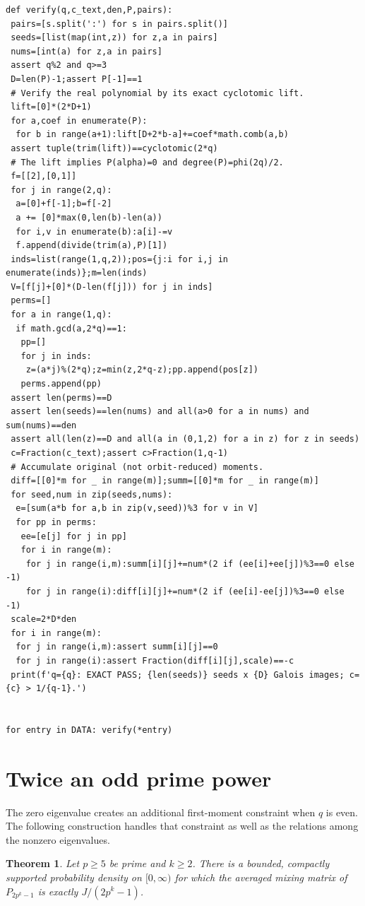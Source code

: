 \documentclass[11pt,a4paper]{article}
\newtheorem{theorem}{Theorem}[section]
\theoremstyle{definition}\newtheorem{definition}[theorem]{Definition}
\theoremstyle{remark}\newtheorem{remark}[theorem]{Remark}
\begin{document}
{\begin{verbatim}
def verify(q,c_text,den,P,pairs):
 pairs=[s.split(':') for s in pairs.split()]
 seeds=[list(map(int,z)) for z,a in pairs]
 nums=[int(a) for z,a in pairs]
 assert q%2 and q>=3
 D=len(P)-1;assert P[-1]==1
 # Verify the real polynomial by its exact cyclotomic lift.
 lift=[0]*(2*D+1)
 for a,coef in enumerate(P):
  for b in range(a+1):lift[D+2*b-a]+=coef*math.comb(a,b)
 assert tuple(trim(lift))==cyclotomic(2*q)
 # The lift implies P(alpha)=0 and degree(P)=phi(2q)/2.
 f=[[2],[0,1]]
 for j in range(2,q):
  a=[0]+f[-1];b=f[-2]
  a += [0]*max(0,len(b)-len(a))
  for i,v in enumerate(b):a[i]-=v
  f.append(divide(trim(a),P)[1])
 inds=list(range(1,q,2));pos={j:i for i,j in enumerate(inds)};m=len(inds)
 V=[f[j]+[0]*(D-len(f[j])) for j in inds]
 perms=[]
 for a in range(1,q):
  if math.gcd(a,2*q)==1:
   pp=[]
   for j in inds:
    z=(a*j)%(2*q);z=min(z,2*q-z);pp.append(pos[z])
   perms.append(pp)
 assert len(perms)==D
 assert len(seeds)==len(nums) and all(a>0 for a in nums) and sum(nums)==den
 assert all(len(z)==D and all(a in (0,1,2) for a in z) for z in seeds)
 c=Fraction(c_text);assert c>Fraction(1,q-1)
 # Accumulate original (not orbit-reduced) moments.
 diff=[[0]*m for _ in range(m)];summ=[[0]*m for _ in range(m)]
 for seed,num in zip(seeds,nums):
  e=[sum(a*b for a,b in zip(v,seed))%3 for v in V]
  for pp in perms:
   ee=[e[j] for j in pp]
   for i in range(m):
    for j in range(i,m):summ[i][j]+=num*(2 if (ee[i]+ee[j])%3==0 else -1)
    for j in range(i):diff[i][j]+=num*(2 if (ee[i]-ee[j])%3==0 else -1)
 scale=2*D*den
 for i in range(m):
  for j in range(i,m):assert summ[i][j]==0
  for j in range(i):assert Fraction(diff[i][j],scale)==-c
 print(f'q={q}: EXACT PASS; {len(seeds)} seeds x {D} Galois images; c={c} > 1/{q-1}.')


for entry in DATA: verify(*entry)
\end{verbatim}
}


\section{Twice an odd prime power}
\label{sec:twice-prime-powers}

The zero eigenvalue creates an additional first-moment constraint when
$q$ is even. The following construction handles that constraint as well
as the relations among the nonzero eigenvalues.

\begin{theorem}\label{thm:twice-prime-powers}
Let $p\ge5$ be prime and $k\ge2$. There is a bounded, compactly
supported probability density on $[0,\infty)$ for which the averaged
mixing matrix of $P_{2p^k-1}$ is exactly $J/(2p^k-1)$.
\end{theorem}
\end{document}
